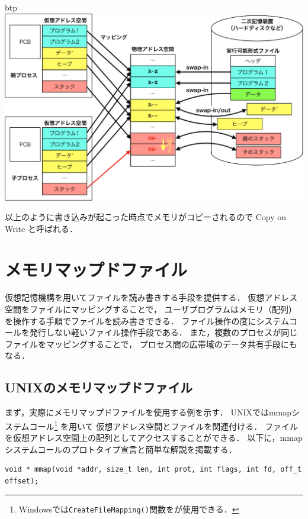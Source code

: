 \begin{description}
\begin{myfig}{btp}
    \includegraphics[scale=0.66]{Fig/virtualMemoryCOW-crop.pdf}
  \end{myfig}
\end{description}

以上のように書き込みが起こった時点でメモリがコピーされるので
Copy on Write と呼ばれる．

\section{メモリマップドファイル}
仮想記憶機構を用いてファイルを読み書きする手段を提供する．
仮想アドレス空間をファイルにマッピングすることで，
ユーザプログラムはメモリ（配列）を操作する手順でファイルを読み書きできる．
ファイル操作の度にシステムコールを発行しない軽いファイル操作手段である．
また，複数のプロセスが同じファイルをマッピングすることで，
プロセス間の広帯域のデータ共有手段にもなる．

\subsection{UNIXのメモリマップドファイル}
まず，実際にメモリマップドファイルを使用する例を示す．
UNIXではmmapシステムコール\footnote{
Windowsでは\texttt{CreateFileMapping()}関数をが使用できる．} を用いて
仮想アドレス空間とファイルを関連付ける．
ファイルを仮想アドレス空間上の配列としてアクセスすることができる．
以下に，mmapシステムコールのプロトタイプ宣言と簡単な解説を掲載する．

\begin{lstlisting}[numbers=none]
void * mmap(void *addr, size_t len, int prot, int flags, int fd, off_t offset);
\end{lstlisting}

